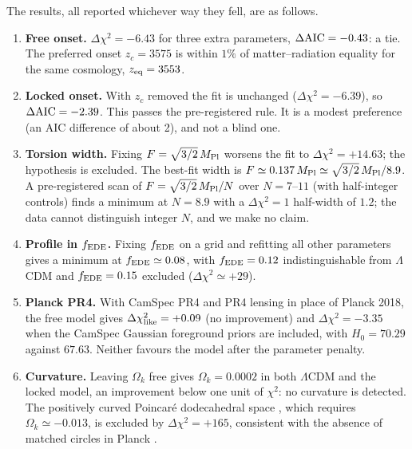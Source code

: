 \documentclass[11pt]{article}
\newcommand{\Mp}{M_{\rm Pl}}
\begin{document}
The results, all reported whichever way they fell, are as follows.
\begin{enumerate}
\item \textbf{Free onset.} $\Delta\chi^2=-6.43$ for three extra parameters,
$\Delta{\rm AIC}=-0.43$: a tie. The preferred onset $z_c=3575$ is within $1\%$ of matter--radiation
equality for the same cosmology, $z_{\rm eq}=3553$.
\item \textbf{Locked onset.} With $z_c$ removed the fit is unchanged ($\Delta\chi^2=-6.39$), so
$\Delta{\rm AIC}=-2.39$. This passes the pre-registered rule. It is a modest preference
(an AIC difference of about 2), and not a blind one.
\item \textbf{Torsion width.} Fixing $F=\sqrt{3/2}\,\Mp$ worsens the fit to
$\Delta\chi^2=+14.63$; the hypothesis is excluded. The best-fit width is
$F\simeq0.137\,\Mp\simeq\sqrt{3/2}\,\Mp/8.9$. A pre-registered scan of $F=\sqrt{3/2}\,\Mp/N$
over $N=7$--$11$ (with half-integer controls) finds a minimum at $N=8.9$ with a
$\Delta\chi^2=1$ half-width of $1.2$; the data cannot distinguish integer $N$, and we make
no claim.
\item \textbf{Profile in $f_{\rm EDE}$.} Fixing $f_{\rm EDE}$ on a grid and refitting all other
parameters gives a minimum at $f_{\rm EDE}\simeq0.08$, with $f_{\rm EDE}=0.12$ indistinguishable
from $\Lambda$CDM and $f_{\rm EDE}=0.15$ excluded ($\Delta\chi^2\simeq+29$).
\item \textbf{Planck PR4.} With CamSpec PR4 and PR4 lensing in place of Planck 2018, the free
model gives $\Delta\chi^2_{\rm like}=+0.09$ (no improvement) and $\Delta\chi^2=-3.35$ when the
CamSpec Gaussian foreground priors are included, with $H_0=70.29$ against $67.63$. Neither
favours the model after the parameter penalty.
\item \textbf{Curvature.} Leaving $\Omega_k$ free gives $\Omega_k=0.0002$ in both
$\Lambda$CDM and the locked model, an improvement below one unit of $\chi^2$: no curvature is
detected. The positively curved Poincar\'e dodecahedral space \cite{luminet2003}, which
requires $\Omega_k\simeq-0.013$, is excluded by $\Delta\chi^2=+165$, consistent with the
absence of matched circles in Planck \cite{planck2016topo}.
\end{enumerate}

\end{document}
